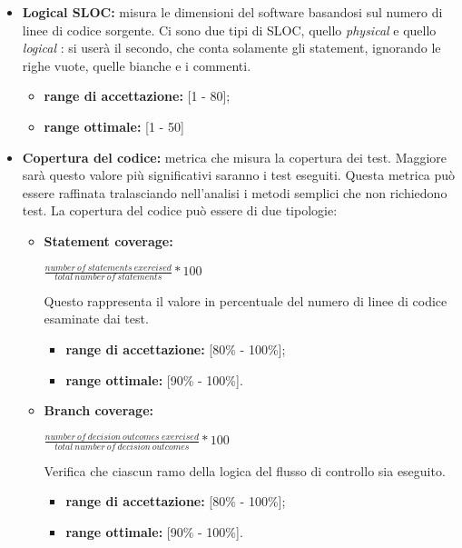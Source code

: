 \begin{itemize}
				\item \textbf{Logical SLOC:} misura le dimensioni del software basandosi sul numero di linee di codice sorgente. Ci sono due tipi di SLOC, quello \textit{physical} e quello \textit{logical} : si userà il secondo, che conta solamente gli statement, ignorando le righe vuote, quelle bianche e i commenti.
				\begin{itemize}
					\item \textbf{range di accettazione:} [1 - 80]; 
					\item \textbf{range ottimale:} [1 - 50]
				\end{itemize}
								
				\item \textbf{Copertura del codice:} metrica che misura la copertura dei test. Maggiore sarà questo valore più significativi saranno i test eseguiti. Questa metrica può essere raffinata tralasciando nell'analisi i metodi semplici che non richiedono test. La copertura del codice può essere di due tipologie:
				\begin{itemize}
					\item \textbf{Statement coverage:}\\
					\begin{center}
						\begin{math}
							\frac{number\ of\ statements\ exercised} {total\ number\ of\ statements} * 100
						\end{math}
					\end{center}
					Questo rappresenta il valore in percentuale del numero di linee di codice esaminate dai test.
					\begin{itemize}
						\item \textbf{range di accettazione:} [80\% - 100\%];
						\item \textbf{range ottimale:} [90\% - 100\%].
					\end{itemize}
					\item \textbf{Branch coverage:}\\
					\begin{center}
						\begin{math}
							\frac{number\ of\ decision\ outcomes\ exercised}{total\ number\ of\ decision\ outcomes} * 100
						\end{math}
					\end{center}
					Verifica che ciascun ramo della logica del flusso di controllo sia eseguito.
					\begin{itemize}
						\item \textbf{range di accettazione:} [80\% - 100\%];
						\item \textbf{range ottimale:} [90\% - 100\%].
					\end{itemize}		
				\end{itemize}					
				

\end{itemize}
